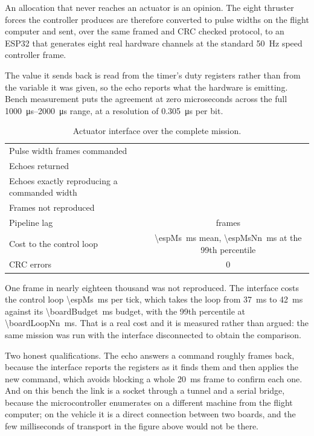 \documentclass[10pt,a4paper]{article}
\begin{document}
An allocation that never reaches an actuator is an opinion. The eight thruster
forces the controller produces are therefore converted to pulse widths on the
flight computer and sent, over the same framed and CRC checked protocol, to an
ESP32 that generates eight real hardware channels at the standard
\SI{50}{\hertz} speed controller frame.

The value it sends back is read from the timer's duty registers rather than
from the variable it was given, so the echo reports what the hardware is
emitting. Bench measurement puts the agreement at zero microseconds across the
full \SIrange{1000}{2000}{\micro\second} range, at a resolution of
\SI{0.305}{\micro\second} per bit.

\begin{table}[htbp]\centering\small
\caption{Actuator interface over the complete mission.}
\begin{tabular}{lc}
\toprule
Pulse width frames commanded & \espSent{} \\
Echoes returned & \espEchoes{} \\
Echoes exactly reproducing a commanded width & \espMatched{} \\
Frames not reproduced & \espMismatch{} \\
Pipeline lag & \espLag{} frames \\
Cost to the control loop & \SI{\espMs}{\milli\second} mean,
\SI{\espMsNn}{\milli\second} at the 99th percentile \\
CRC errors & \num{0} \\
\bottomrule
\end{tabular}
\end{table}

One frame in nearly eighteen thousand was not reproduced. The interface costs
the control loop \SI{\espMs}{\milli\second} per tick, which takes the loop from
\SI{37}{\milli\second} to \SI{42}{\milli\second} against its
\SI{\boardBudget}{\milli\second} budget, with the 99th percentile at
\SI{\boardLoopNn}{\milli\second}. That is a real cost and it is measured rather
than argued: the same mission was run with the interface disconnected to obtain
the comparison.

Two honest qualifications. The echo answers a command roughly
\espLag{} frames back, because the interface reports the registers as it finds
them and then applies the new command, which avoids blocking a whole
\SI{20}{\milli\second} frame to confirm each one. And on this bench the link is
a socket through a tunnel and a serial bridge, because the microcontroller
enumerates on a different machine from the flight computer; on the vehicle it
is a direct connection between two boards, and the few milliseconds of
transport in the figure above would not be there.
\end{document}
